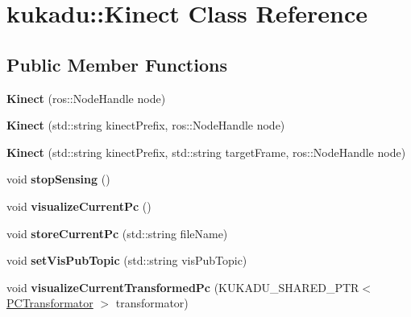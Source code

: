\hypertarget{classkukadu_1_1Kinect}{\section{kukadu\-:\-:Kinect Class Reference}
\label{classkukadu_1_1Kinect}
}
\subsection*{Public Member Functions}
\begin{DoxyCompactItemize}
\item 
\hypertarget{classkukadu_1_1Kinect_aa876f2bcbfe9e3b86b26805fd2275f92}{{\bfseries Kinect} (ros\-::\-Node\-Handle node)}\label{classkukadu_1_1Kinect_aa876f2bcbfe9e3b86b26805fd2275f92}

\item 
\hypertarget{classkukadu_1_1Kinect_a7c31585a1d1d6060f6028da75b31e4dd}{{\bfseries Kinect} (std\-::string kinect\-Prefix, ros\-::\-Node\-Handle node)}\label{classkukadu_1_1Kinect_a7c31585a1d1d6060f6028da75b31e4dd}

\item 
\hypertarget{classkukadu_1_1Kinect_a62836f11aa0491e7bf2317df0d7c709f}{{\bfseries Kinect} (std\-::string kinect\-Prefix, std\-::string target\-Frame, ros\-::\-Node\-Handle node)}\label{classkukadu_1_1Kinect_a62836f11aa0491e7bf2317df0d7c709f}

\item 
\hypertarget{classkukadu_1_1Kinect_aa8f05b757c4a42a25a9cc578451a823d}{void {\bfseries stop\-Sensing} ()}\label{classkukadu_1_1Kinect_aa8f05b757c4a42a25a9cc578451a823d}

\item 
\hypertarget{classkukadu_1_1Kinect_aa8041a511f9343ead3b7d1d4c889bc58}{void {\bfseries visualize\-Current\-Pc} ()}\label{classkukadu_1_1Kinect_aa8041a511f9343ead3b7d1d4c889bc58}

\item 
\hypertarget{classkukadu_1_1Kinect_a9031c091eb4e7a4400adb5a103d372fa}{void {\bfseries store\-Current\-Pc} (std\-::string file\-Name)}\label{classkukadu_1_1Kinect_a9031c091eb4e7a4400adb5a103d372fa}

\item 
\hypertarget{classkukadu_1_1Kinect_a3369fd48304d308426052f8567139589}{void {\bfseries set\-Vis\-Pub\-Topic} (std\-::string vis\-Pub\-Topic)}\label{classkukadu_1_1Kinect_a3369fd48304d308426052f8567139589}

\item 
\hypertarget{classkukadu_1_1Kinect_aa944fc517785fb7016b21c3702647561}{void {\bfseries visualize\-Current\-Transformed\-Pc} (K\-U\-K\-A\-D\-U\-\_\-\-S\-H\-A\-R\-E\-D\-\_\-\-P\-T\-R$<$ \hyperlink{classPCTransformator}{P\-C\-Transformator} $>$ transformator)}\label{classkukadu_1_1Kinect_aa944fc517785fb7016b21c3702647561}


\end{DoxyCompactItemize}
